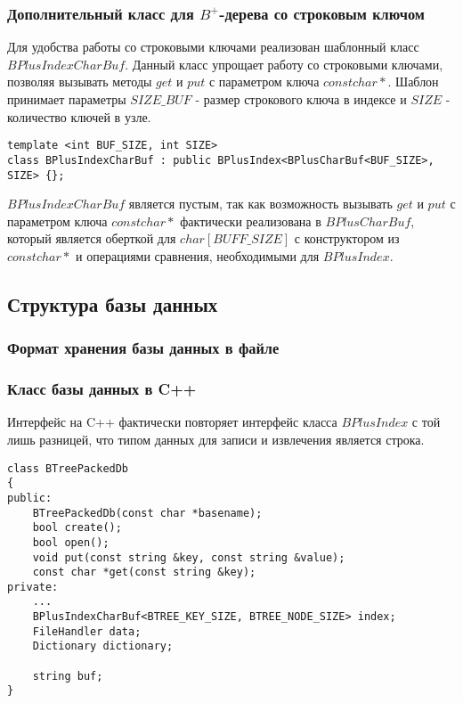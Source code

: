 \documentclass[14pt, russian]{scrartcl}
\begin{document}
\subsubsection{Дополнительный класс для $B^+$-дерева со строковым ключом}

Для удобства работы со строковыми ключами реализован шаблонный класс $BPlusIndexCharBuf$. Данный класс упрощает работу
со строковыми ключами, позволяя вызывать методы $get$ и $put$ с параметром ключа $const char*$. Шаблон принимает
параметры $SIZE\_BUF$ - размер строкового ключа в индексе и $SIZE$ - количество ключей в узле.

\begin{verbatim}
template <int BUF_SIZE, int SIZE>
class BPlusIndexCharBuf : public BPlusIndex<BPlusCharBuf<BUF_SIZE>, SIZE> {};
\end{verbatim}

$BPlusIndexCharBuf$ является пустым, так как возможность вызывать $get$ и $put$ с параметром ключа $const char*$ фактически реализована в $BPlusCharBuf$, который является оберткой для $char [BUFF\_SIZE]$ с конструктором из $const char*$ и операциями сравнения, необходимыми для $BPlusIndex$.

\subsection{Структура базы данных}
\subsubsection{Формат хранения базы данных в файле}
\subsubsection{Класс базы данных в C++}

Интерфейс на C++ фактически повторяет интерфейс класса $BPlusIndex$ с той лишь разницей, что типом данных
для записи и извлечения является строка.

\begin{verbatim}
class BTreePackedDb
{
public:
    BTreePackedDb(const char *basename);
    bool create();
    bool open();
    void put(const string &key, const string &value);
    const char *get(const string &key);
private:
    ...
    BPlusIndexCharBuf<BTREE_KEY_SIZE, BTREE_NODE_SIZE> index;
    FileHandler data;
    Dictionary dictionary;  

    string buf;
}
\end{verbatim}
\end{document}
